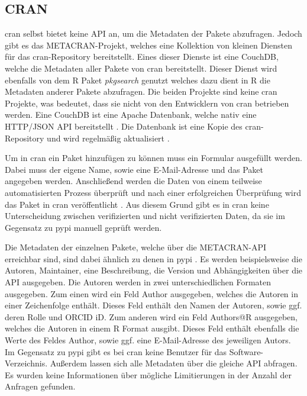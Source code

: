 \subsection{CRAN}
\label{subsec:paketverwaltung_cran}
\gls{cran} selbst bietet keine API an, um die Metadaten der Pakete abzufragen.
Jedoch gibt es das METACRAN-Projekt, welches eine Kollektion von kleinen Diensten für das \gls{cran}-Repository bereitstellt.
Eines dieser Dienste ist eine CouchDB, welche die Metadaten aller Pakete von \gls{cran} bereitstellt.
Dieser Dienst wird ebenfalls von dem R Paket \emph{pkgsearch} genutzt welches dazu dient in R die Metadaten anderer Pakete abzufragen.
Die beiden Projekte sind keine \gls{cran} Projekte, was bedeutet, dass sie nicht von den Entwicklern von \gls{cran} betrieben werden.
Eine CouchDB ist eine Apache Datenbank, welche nativ eine HTTP/JSON API bereitstellt \autocite{the_apache_software_foundation_apache_2024}.
Die Datenbank ist eine Kopie des \gls{cran}-Repository und wird regelmäßig aktualisiert \autocite{csardi_pkgsearch_2023}.

Um in \gls{cran} ein Paket hinzufügen zu können muss ein Formular ausgefüllt werden.
Dabei muss der eigene Name, sowie eine E-Mail-Adresse und das Paket angegeben werden.
Anschließend werden die Daten von einem teilweise automatisierten Prozess überprüft und nach einer erfolgreichen Überprüfung wird das Paket in \gls{cran} veröffentlicht \autocite{altmann_comprehensive_2024}.
Aus diesem Grund gibt es in \gls{cran} keine Unterscheidung zwischen verifizierten und nicht verifizierten Daten, da sie im Gegensatz zu \gls{pypi} manuell geprüft werden.

Die Metadaten der einzelnen Pakete, welche über die METACRAN-API erreichbar sind, sind dabei ähnlich zu denen in \gls{pypi} \autocite{csardi_pkgsearch_2023}.
Es werden beispielsweise die Autoren, Maintainer, eine Beschreibung, die Version und Abhängigkeiten über die API ausgegeben.
Die Autoren werden in zwei unterschiedlichen Formaten ausgegeben.
Zum einen wird ein Feld \glqq Author\grqq{} ausgegeben, welches die Autoren in einer Zeichenfolge enthält.
Dieses Feld enthält den Namen der Autoren, sowie ggf. deren Rolle und ORCID iD.
Zum anderen wird ein Feld \glqq Authors@R\grqq{} ausgegeben, welches die Autoren in einem R Format ausgibt.
Dieses Feld enthält ebenfalls die Werte des Feldes \glqq Author\grqq{}, sowie ggf. eine E-Mail-Adresse des jeweiligen Autors. 
Im Gegensatz zu \gls{pypi} gibt es bei \gls{cran} keine Benutzer für das Software-Verzeichnis.
Außerdem lassen sich alle Metadaten über die gleiche API abfragen.
Es wurden keine Informationen über mögliche Limitierungen in der Anzahl der Anfragen gefunden.
